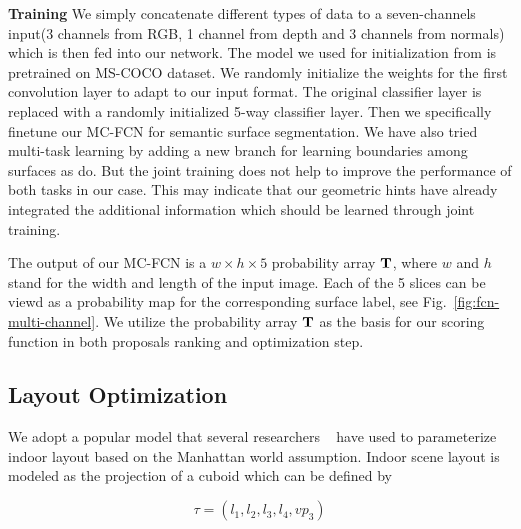 \textbf{Training}
We simply concatenate different types of data to a seven-channels input(3 channels from RGB, 1 channel from depth and 3 channels from normals) which is then fed into our network. The model we used for initialization from \cite{chen2016deeplab} is pretrained on MS-COCO dataset. We randomly initialize the weights for the first convolution layer to adapt to our input format. The original classifier layer is replaced with a randomly initialized 5-way classifier layer. Then we specifically finetune our MC-FCN for semantic surface segmentation. We have also tried multi-task learning by adding a new branch for learning boundaries among surfaces as \cite{ren2016coarse, mallya2015learning} do. But the joint training does not help to improve the performance of both tasks in our case. This may indicate that our geometric hints have already integrated the additional information which should be learned through joint training.

The output of our MC-FCN is a $w\times h \times 5$ probability array $\mathbf{T}$, where $w$ and $h$ stand for the width and length of the input image. Each of the 5 slices can be viewd as a probability map for the corresponding surface label, see Fig.~\ref{fig:fcn-multi-channel}. We utilize the probability array $\mathbf{T}$ as the basis for our scoring function in both proposals ranking and optimization step. 


\subsection{Layout Optimization}
\label{sec:optimization}
We adopt a popular model that several researchers ~\cite{hedau2009recovering, wang2013discriminative, dasgupta2016delay, ren2016coarse} have used to parameterize indoor layout based on the Manhattan world assumption. 
Indoor scene layout is modeled as the projection of a cuboid which can be defined by 

\begin{equation}
	\label{eq:Layout}
	\tau = (l_1, l_2, l_3, l_4, vp_3)
\end{equation}

